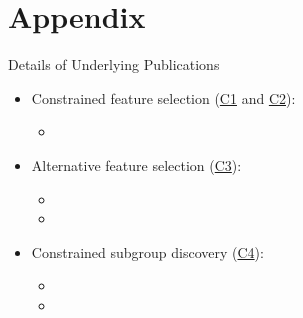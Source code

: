 \documentclass[en, navbarinline, handout]{sdqbeamer}
\begin{document}
\section{Appendix}

\begin{frame}[t]{Details of Underlying Publications}
	\begin{itemize}
		\item Constrained feature selection (\hyperlink{slide:contributions}{C1} and \hyperlink{slide:contributions}{C2}):
		\begin{itemize}
			\item {}
		\end{itemize}
		\item Alternative feature selection (\hyperlink{slide:contributions}{C3}):
		\begin{itemize}
			\item {}
			\item {}
		\end{itemize}
		\item Constrained subgroup discovery (\hyperlink{slide:contributions}{C4}):
		\begin{itemize}
			\item {}
			\item {}
		\end{itemize}
	\end{itemize}
\end{frame}
\end{document}
